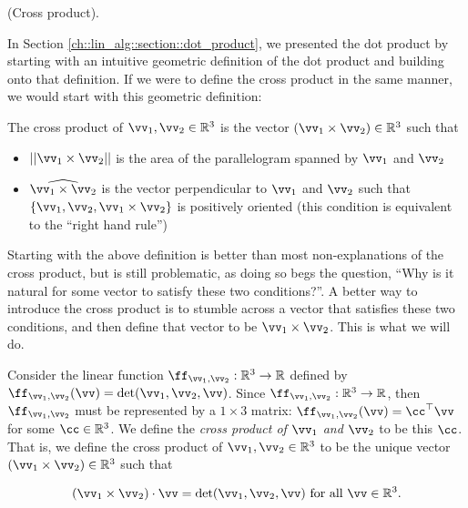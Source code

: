\begin{deriv}
    (Cross product). 
    
    In Section \ref{ch::lin_alg::section::dot_product}, we presented the dot product by starting with an intuitive geometric definition of the dot product and building onto that definition. If we were to define the cross product in the same manner, we would start with this geometric definition:
    
    \vspace{.25cm}
    
    \begin{addmargin}[3em]{2em}
        The cross product of $\vv_1, \vv_2 \in \R^3$ is the vector $(\vv_1 \times \vv_2) \in \R^3$ such that

        \begin{itemize}
            \item $||\vv_1 \times \vv_2||$ is the area of the parallelogram spanned by $\vv_1$ and $\vv_2$
            \item $\widehat{\vv_1 \times \vv_2}$ is the vector perpendicular to $\vv_1$ and $\vv_2$ such that $\{\vv_1, \vv_2, \vv_1 \times \vv_2\}$ is positively oriented (this condition is equivalent to the ``right hand rule'')
        \end{itemize}
    \end{addmargin}
    
    Starting with the above definition is better than most non-explanations of the cross product, but is still problematic, as doing so begs the question, ``Why is it natural for some vector to satisfy these two conditions?''. A better way to introduce the cross product is to stumble across a vector that satisfies these two conditions, and then define that vector to be $\vv_1 \times \vv_2$. This is what we will do.

    Consider the linear function $\ff_{\vv_1,\vv_2}:\R^3 \rightarrow \R$ defined by $\ff_{\vv_1,\vv_2}(\vv) = \det(\vv_1, \vv_2, \vv)$. Since ${\ff_{\vv_1,\vv_2}:\R^3 \rightarrow \R}$, then $\ff_{\vv_1,\vv_2}$ must be represented by a $1 \times 3$ matrix: $\ff_{\vv_1, \vv_2}(\vv) = \cc^\top \vv$ for some $\cc \in \R^3$. We define the \textit{cross product of $\vv_1$ and $\vv_2$} to be this $\cc$. That is, we define the cross product of $\vv_1, \vv_2 \in \R^3$ to be the unique vector $(\vv_1 \times \vv_2) \in \R^3$ such that
    
    \begin{align*}
        (\vv_1 \times \vv_2) \cdot \vv = \det(\vv_1, \vv_2, \vv) \text{ for all $\vv \in \R^3$}.
    \end{align*}
\end{deriv}

